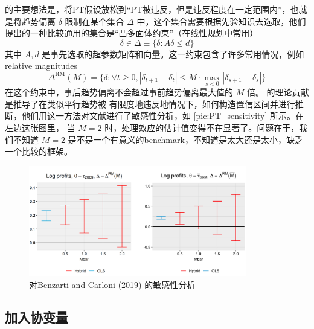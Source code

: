 \documentclass[../didNotes.tex]{subfiles}
\begin{document}
\textcite{rambachan2023} 的主要想法是，将PT假设放松到``PT被违反，但是违反程度在一定范围内''，也就是将趋势偏离 $\delta$ 限制在某个集合
$\Delta$ 中，这个集合需要根据先验知识去选取，他们提出的一种比较通用的集合是``凸多面体约束''（在线性规划中常用）
$$
\delta \in \Delta \equiv \{ \delta: A \delta \le d \}
$$
其中 $A,d$ 是事先选取的超参数矩阵和向量。这一约束包含了许多常用情况，例如relative magnitudes
$$
\Delta^{\text{RM}}(M) = \{ \delta: \forall t \ge 0,\left\vert \delta_{t+1}-\delta_{t} \right\vert \le M \cdot
\max_{s<0} \left\vert \delta_{s+1}-\delta_{s} \right\vert  \}
$$
在这个约束中，事后趋势偏离不会超过事前趋势偏离最大值的 $M$ 倍。\textcite{rambachan2023} 的理论贡献是推导了在类似平行趋势被
有限度地违反地情况下，如何构造置信区间并进行推断，他们用这一方法对文献进行了敏感性分析，如 \autoref{pic:PT_sensitivity} 所示。在左边这张图里，
当 $M=2$ 时，处理效应的估计值变得不在显著了。问题在于，我们不知道 $M=2$ 是不是一个有意义的benchmark，不知道是太大还是太小，缺乏一个比较的框架。

\begin{figure}[htbp]
  \begin{center}
    \includegraphics[width=0.85\textwidth]{./assets/PT_sensitivity.png}
  \end{center}
  \caption{对Benzarti and Carloni (2019) 的敏感性分析}
  \label{pic:PT_sensitivity}
\end{figure}

\subsection{加入协变量}
\end{document}
